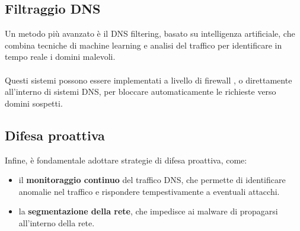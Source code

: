 \subsection*{Filtraggio DNS}
Un metodo più avanzato è il DNS filtering, basato su 
intelligenza artificiale, che combina tecniche di machine 
learning e analisi del traffico per identificare in tempo
reale i domini malevoli. 
\\\\
Questi sistemi possono essere implementati a livello di firewall ,
o direttamente all'interno di sistemi DNS, per bloccare 
automaticamente le richieste verso domini sospetti.  

\subsection*{Difesa proattiva}
Infine, è fondamentale adottare strategie di difesa proattiva, 
come:
\begin{itemize}
    \item il \textbf{monitoraggio continuo} del traffico DNS, che permette 
    di identificare anomalie nel traffico e rispondere
    tempestivamente a eventuali attacchi.
    \item la \textbf{segmentazione della rete}, che impedisce ai 
    malware di propagarsi all'interno della rete.
\end{itemize}